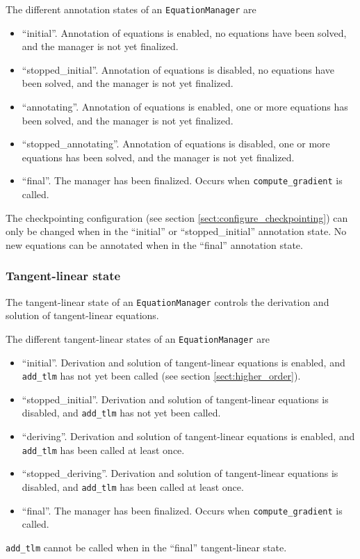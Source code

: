\documentclass[11pt]{article}
\begin{document}
The different annotation states of an \texttt{EquationManager} are
\begin{itemize}
  \item ``initial''. Annotation of equations is enabled, no equations have been
    solved, and the manager is not yet finalized.
  \item ``stopped\_initial''. Annotation of equations is disabled, no equations
    have been solved, and the manager is not yet finalized.
  \item ``annotating''. Annotation of equations is enabled, one or more
    equations has been solved, and the manager is not yet finalized.
  \item ``stopped\_annotating''. Annotation of equations is disabled, one or
    more equations has been solved, and the manager is not yet finalized.
  \item ``final''. The manager has been finalized. Occurs when
    \texttt{compute\_gradient} is called.
\end{itemize}
The checkpointing configuration (see section
\ref{sect:configure_checkpointing}) can only be changed when in the ``initial''
or ``stopped\_initial'' annotation state. No new equations can be annotated
when in the ``final'' annotation state.

\subsubsection{Tangent-linear state}

The tangent-linear state of an \texttt{EquationManager} controls the derivation
and solution of tangent-linear equations.

The different tangent-linear states of an \texttt{EquationManager} are
\begin{itemize}
  \item ``initial''. Derivation and solution of tangent-linear equations is
    enabled, and \texttt{add\_tlm} has not yet been called (see section
    \ref{sect:higher_order}).
  \item ``stopped\_initial''. Derivation and solution of tangent-linear
    equations is disabled, and  \texttt{add\_tlm} has not yet been called.
  \item ``deriving''. Derivation and solution of tangent-linear equations is
    enabled, and \texttt{add\_tlm} has been called at least once.
  \item ``stopped\_deriving''. Derivation and solution of tangent-linear
    equations is disabled, and \texttt{add\_tlm} has been called at least once.
  \item ``final''. The manager has been finalized. Occurs when
    \texttt{compute\_gradient} is called.
\end{itemize}
\texttt{add\_tlm} cannot be called when in the ``final'' tangent-linear state.
\end{document}
